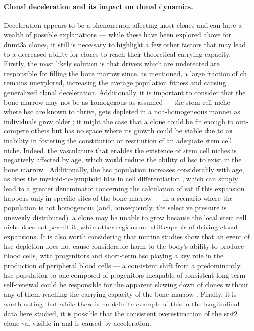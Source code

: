\paragraph{Clonal deceleration and its impact on clonal dynamics.} Deceleration appears to be a phenomenon affecting most clones and can have a wealth of possible explanations --- while these have been explored above for \ac{dnmt3a} clones, it still is necessary to highlight a few other factors that may lead to a decreased ability for clones to reach their theoretical carrying capacity. Firstly, the most likely solution is that drivers which are undetected are responsible for filling the bone marrow since, as mentioned, a large fraction of \ac{ch} remains unexplored, increasing the average population fitness and causing generalized clonal deceleration. Additionally, it is important to consider that the bone marrow may not be as homogenous as assumed --- the stem cell niche, where \ac{hsc} are known to thrive, gets depleted in a non-homogeneous manner as individuals grow older \cite{Crane2017-hl}; it might the case that a clone could be fit enough to out-compete others but has no space where its growth could be viable due to an inability in fostering the constitution or restitution of an adequate stem cell niche. Indeed, the vasculature that enables the existence of stem cell niches is negatively affected by age, which would reduce the ability of \ac{hsc} to exist in the bone marrow \cite{Tanaka2017-pu,Wang2017-rg}. Additionally, the \ac{hsc} population increases considerably with age, as does the myeloid-to-lymphoid bias in cell differentiation \cite{Pang2011-dw}, which can simply lead to a greater denominator concerning the calculation of \ac{vaf} if this expansion happens only in specific sites of the bone marrow --- in a scenario where the population is not homogenous (and, consequently, the selective pressure is unevenly distributed), a clone may be unable to grow because the local stem cell niche does not permit it, while other regions are still capable of driving clonal expansions. It is also worth considering that murine studies show that an event of \ac{hsc} depletion does not cause considerable harm to the body's ability to produce blood cells, with progenitors and short-term \ac{hsc} playing a key role in the production of peripheral blood cells --- a consistent shift from a predominantly \ac{hsc} population to one composed of progenitors incapable of consistent long-term self-renewal could be responsible for the apparent slowing down of clones without any of them reaching the carrying capacity of the bone marrow \cite{Schoedel2016-bi,Mitchell2021-zl}. Finally, it is worth noting that while there is no definite example of this in the longitudinal data here studied, it is possible that the consistent overestimation of the \ac{srsf2} clone \ac{vaf} visible in  and  is caused by deceleration.

